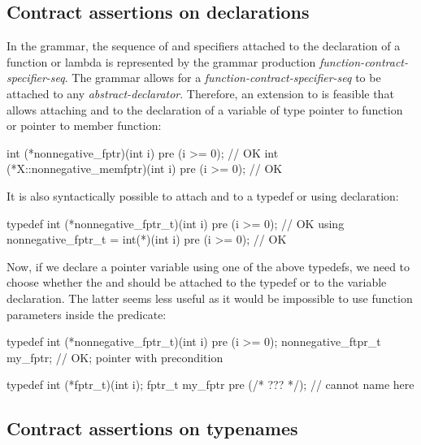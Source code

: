 \subsection{Contract assertions on declarations}

In the \cite{P2900R9} grammar, the sequence of  and  specifiers attached to the declaration of a function or lambda is represented by the grammar production \emph{function-contract-specifier-seq}. The grammar allows for a \emph{function-contract-specifier-seq} to be attached to any \emph{abstract-declarator}. Therefore, an extension to \cite{P2900R9} is feasible that allows attaching  and  to the declaration of a variable of type pointer to function or pointer to member function:
\begin{codeblock}
int (*nonnegative_fptr)(int i) pre (i >= 0);        // OK
int (*X::nonnegative_memfptr)(int i) pre (i >= 0);  // OK
\end{codeblock}
It is also syntactically possible to attach  and  to a typedef or using declaration:
\begin{codeblock}
typedef int (*nonnegative_fptr_t)(int i) pre (i >= 0);  // OK
using nonnegative_fptr_t = int(*)(int i) pre (i >= 0);  // OK
\end{codeblock}
Now, if we declare a pointer variable using one of the above typedefs, we need to choose whether the   and  should be attached to the typedef or to the variable declaration. The latter seems less useful as it would be impossible to use function parameters inside the predicate:
\begin{codeblock}
typedef int (*nonnegative_fptr_t)(int i) pre (i >= 0);  
nonnegative_ftpr_t my_fptr;  // OK; pointer with precondition

typedef int (*fptr_t)(int i);
fptr_t my_fptr pre (/* ??? */);  // cannot name  here
\end{codeblock}

\subsection{Contract assertions on typenames}

